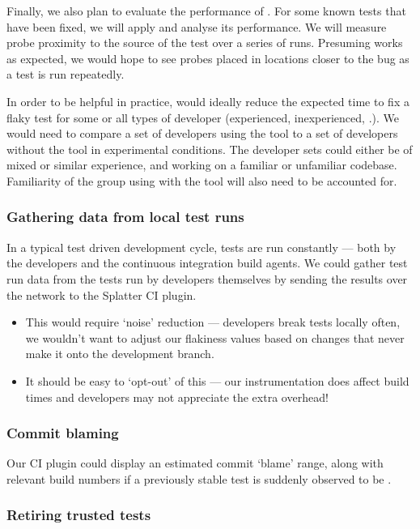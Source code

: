 Finally, we also plan to evaluate the performance of \splatter. For some known
\flaky tests that have been fixed, we will apply \splatter and analyse its
performance. We will measure probe proximity to the source of the \flaky test
over a series of runs. Presuming \splatter works as expected, we would hope to
see probes placed in locations closer to the bug as a test is run repeatedly.

In order to be helpful in practice, \splatter would ideally reduce the expected
time to fix a flaky test for some or all types of developer (experienced,
inexperienced, \etc.). We would need to compare a set of developers using the
tool to a set of developers without the tool in experimental conditions. The
developer sets could either be of mixed or similar experience, and working on a
familiar or unfamiliar codebase. Familiarity of the group using \splatter with
the tool will also need to be accounted for.

\subsubsection{Gathering data from local test runs}

In a typical test driven development cycle, tests are run constantly --- both by
the developers and the continuous integration build agents. We could gather test
run data from the tests run by developers themselves by sending the results over
the network to the Splatter CI plugin.

\begin{itemize}
	\item This would require {\lq}noise{\rq} reduction --- developers break tests
	locally often, we wouldn't want to adjust our flakiness values based on
	changes that never make it onto the development branch.
	\item It should be easy to {\lq}opt-out{\rq} of this --- our instrumentation
	does affect build times and developers may not appreciate the extra overhead!
\end{itemize}

\subsubsection{Commit blaming}

Our CI plugin could display an estimated commit {\lq}blame{\rq} range, along
with relevant build numbers if a previously stable test is suddenly observed to
be \flaky.

\subsubsection{Retiring trusted tests}

